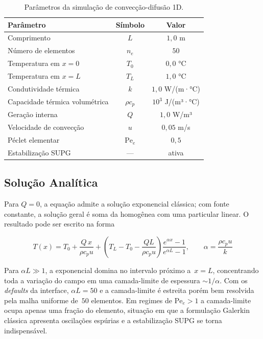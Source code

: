 \begin{table}[htbp]
    \centering
    \caption{Parâmetros da simulação de convecção-difusão 1D.}
    \label{tab:val_convdif_params}
    \begin{tabular}{lcc}
        \hline
        \textbf{Parâmetro} & \textbf{Símbolo} & \textbf{Valor} \\
        \hline
        Comprimento                         & $L$          & $1{,}0$ m          \\
        Número de elementos                 & $n_e$        & $50$               \\
        Temperatura em $x = 0$              & $T_0$        & $0{,}0$ °C         \\
        Temperatura em $x = L$              & $T_L$        & $1{,}0$ °C         \\
        Condutividade térmica               & $k$          & $1{,}0$ W/(m·°C)   \\
        Capacidade térmica volumétrica      & $\rho c_p$   & $10^{3}$ J/(m³·°C) \\
        Geração interna                     & $Q$          & $1{,}0$ W/m³       \\
        Velocidade de convecção             & $u$          & $0{,}05$ m/s       \\
        Péclet elementar                    & $\mathrm{Pe}_e$ & $0{,}5$         \\
        Estabilização SUPG                  & ---          & ativa              \\
        \hline
    \end{tabular}
\end{table}

\subsection{Solução Analítica}

Para $Q = 0$, a equação admite a solução exponencial clássica; com fonte constante, a solução geral é soma da homogênea com uma particular linear. O resultado pode ser escrito na forma

\begin{equation}
    T(x) = T_0 + \frac{Q \, x}{\rho c_p u} + \left( T_L - T_0 - \frac{Q L}{\rho c_p u} \right) \frac{e^{\alpha x} - 1}{e^{\alpha L} - 1}, \qquad \alpha = \frac{\rho c_p u}{k}
    \label{eq:val_convdif_analitica}
\end{equation}

Para $\alpha L \gg 1$, a exponencial domina no intervalo próximo a~$x = L$, concentrando toda a variação do campo em uma camada-limite de espessura $\sim 1/\alpha$. Com os \emph{defaults} da interface, $\alpha L = 50$ e a camada-limite é estreita porém bem resolvida pela malha uniforme de~$50$ elementos. Em regimes de $\mathrm{Pe}_e > 1$ a camada-limite ocupa apenas uma fração do elemento, situação em que a formulação Galerkin clássica apresenta oscilações espúrias e a estabilização SUPG se torna indispensável.

